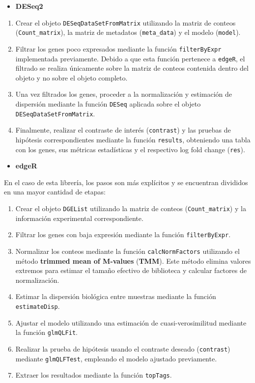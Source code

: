 \documentclass[
  9pt,
]{article}
\providecommand{\tightlist}{%
  \setlength{\itemsep}{0pt}\setlength{\parskip}{0pt}}
\begin{document}
\begin{itemize}
\tightlist
\item
  \textbf{DESeq2}
\end{itemize}

\begin{enumerate}
\def\labelenumi{\arabic{enumi}.}
\item
  Crear el objeto \texttt{DESeqDataSetFromMatrix} utilizando la matriz
  de conteos (\texttt{Count\_matrix}), la matriz de metadatos
  (\texttt{meta\_data}) y el modelo (\texttt{model}).
\item
  Filtrar los genes poco expresados mediante la función
  \texttt{filterByExpr} implementada previamente. Debido a que esta
  función pertenece a \texttt{edgeR}, el filtrado se realiza únicamente
  sobre la matriz de conteos contenida dentro del objeto y no sobre el
  objeto completo.
\item
  Una vez filtrados los genes, proceder a la normalización y estimación
  de dispersión mediante la función \texttt{DESeq} aplicada sobre el
  objeto \texttt{DESeqDataSetFromMatrix}.
\item
  Finalmente, realizar el contraste de interés (\texttt{contrast}) y las
  pruebas de hipótesis correspondientes mediante la función
  \texttt{results}, obteniendo una tabla con los genes, sus métricas
  estadísticas y el respectivo log fold change (\texttt{res}).
\end{enumerate}

\begin{itemize}
\tightlist
\item
  \textbf{edgeR}
\end{itemize}

En el caso de esta librería, los pasos son más explícitos y se
encuentran divididos en una mayor cantidad de etapas:

\begin{enumerate}
\def\labelenumi{\arabic{enumi}.}
\item
  Crear el objeto \texttt{DGEList} utilizando la matriz de conteos
  (\texttt{Count\_matrix}) y la información experimental
  correspondiente.
\item
  Filtrar los genes con baja expresión mediante la función
  \texttt{filterByExpr}.
\item
  Normalizar los conteos mediante la función \texttt{calcNormFactors}
  utilizando el método \textbf{trimmed mean of M-values} (\textbf{TMM}).
  Este método elimina valores extremos para estimar el tamaño efectivo
  de biblioteca y calcular factores de normalización.
\item
  Estimar la dispersión biológica entre muestras mediante la función
  \texttt{estimateDisp}.
\item
  Ajustar el modelo utilizando una estimación de cuasi-verosimilitud
  mediante la función \texttt{glmQLFit}.
\item
  Realizar la prueba de hipótesis usando el contraste deseado
  (\texttt{contrast}) mediante \texttt{glmQLFTest}, empleando el modelo
  ajustado previamente.
\item
  Extraer los resultados mediante la función \texttt{topTags}.
\end{enumerate}
\end{document}
